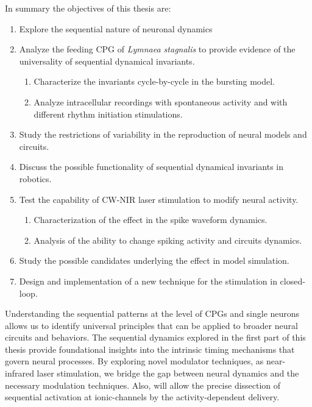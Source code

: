 In summary the objectives of this thesis are:
\begin{enumerate}
    \item Explore the sequential nature of neuronal dynamics
    \item Analyze the feeding CPG of \textit{Lymnaea stagnalis} to provide evidence of the universality of sequential dynamical invariants.
    \begin{enumerate}
        \item Characterize the invariants cycle-by-cycle in the bursting model. 
        \item Analyze intracellular recordings with spontaneous activity and with different rhythm initiation stimulations. 
    \end{enumerate}
    \item Study the restrictions of variability in the reproduction of neural models and circuits.
    \item Discuss the possible functionality of sequential dynamical invariants in robotics. 
    \item Test the capability of CW-NIR laser stimulation to modify neural activity. 
    \begin{enumerate}
        \item Characterization of the effect in the spike waveform dynamics. 
        \item Analysis of the ability to change spiking activity and circuits dynamics. 
    \end{enumerate}
    \item Study the possible candidates underlying the effect in model simulation. 
    \item Design and implementation of a new technique for the stimulation in closed-loop. 
\end{enumerate}

Understanding the sequential patterns at the level of CPGs and single neurons allows us to identify universal principles that can be applied to broader neural circuits and behaviors. The sequential dynamics explored in the first part of this thesis provide foundational insights into the intrinsic timing mechanisms that govern neural processes. By exploring novel modulator techniques, as near-infrared laser stimulation, we bridge the gap between neural dynamics and the necessary modulation techniques. Also, will allow the precise dissection of sequential activation at ionic-channels by the activity-dependent delivery. 
